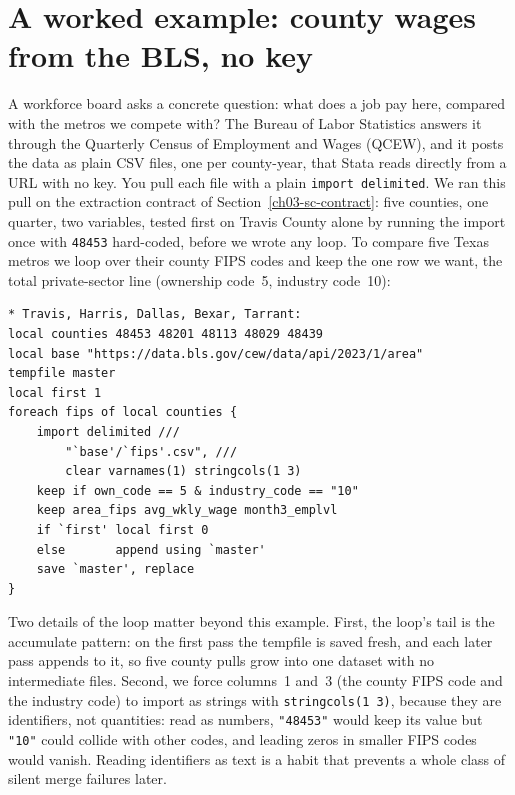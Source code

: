 \documentclass[
    a4paper,
    fontsize=10pt,
    twoside=true,
    numbers=noenddot,
]{kaobook}
\begin{document}
\section{A worked example: county wages from the BLS, no key}\label{sec:qcew}
A workforce board asks a concrete question: what does a job pay here, compared with the metros we compete with? The Bureau of Labor Statistics answers it through the Quarterly Census of Employment and Wages (QCEW), and it posts the data as plain CSV files, one per county-year, that Stata reads directly from a URL with no key. You pull each file with a plain \texttt{import delimited}. We ran this pull on the extraction contract of Section~\ref{ch03-sc-contract}: five counties, one quarter, two variables, tested first on Travis County alone by running the import once with \texttt{48453} hard-coded, before we wrote any loop. To compare five Texas metros we loop over their county FIPS codes and keep the one row we want, the total private-sector line (ownership code~5, industry code~10):
\par
{\footnotesize
\begin{verbatim}
* Travis, Harris, Dallas, Bexar, Tarrant:
local counties 48453 48201 48113 48029 48439
local base "https://data.bls.gov/cew/data/api/2023/1/area"
tempfile master
local first 1
foreach fips of local counties {
    import delimited ///
        "`base'/`fips'.csv", ///
        clear varnames(1) stringcols(1 3)
    keep if own_code == 5 & industry_code == "10"
    keep area_fips avg_wkly_wage month3_emplvl
    if `first' local first 0
    else       append using `master'
    save `master', replace
}
\end{verbatim}
}
Two details of the loop matter beyond this example. First, the loop's tail is the accumulate pattern: on the first pass the tempfile is saved fresh, and each later pass appends to it, so five county pulls grow into one dataset with no intermediate files. Second, we force columns~1 and~3 (the county FIPS code and the industry code) to import as strings with \texttt{stringcols(1 3)}, because they are identifiers, not quantities: read as numbers, \texttt{"48453"} would keep its value but \texttt{"10"} could collide with other codes, and leading zeros in smaller FIPS codes would vanish. Reading identifiers as text is a habit that prevents a whole class of silent merge failures later.
\end{document}
